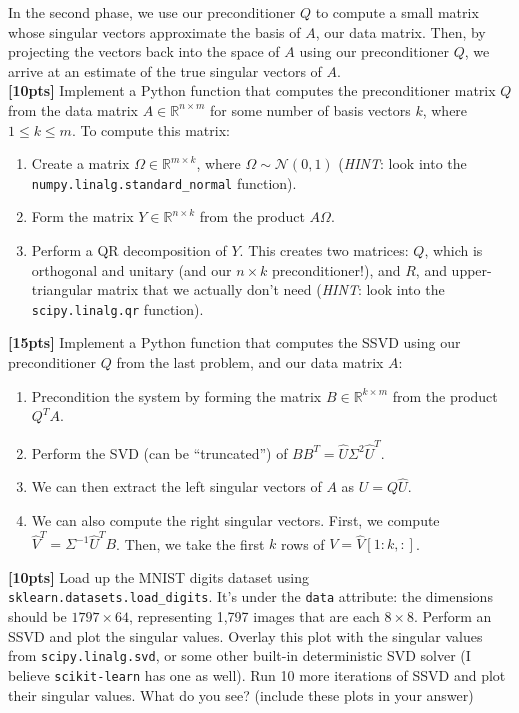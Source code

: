 \documentclass[paper=a4, fontsize=11pt]{scrartcl} %
\numberwithin{figure}{section} %
\numberwithin{table}{section} %
\begin{document}
In the second phase, we use our preconditioner $Q$ to compute a small matrix whose singular vectors approximate the basis of $A$, our data matrix. Then, by projecting the vectors back into the space of $A$ using our preconditioner $Q$, we arrive at an estimate of the true singular vectors of $A$. \\

\textbf{[10pts]} Implement a Python function that computes the preconditioner matrix $Q$ from the data matrix $A \in \mathbb{R}^{n \times m}$ for some number of basis vectors $k$, where $1 \le k \le m$. To compute this matrix:

\begin{enumerate}
	\item Create a matrix $\Omega \in \mathbb{R}^{m \times k}$, where $\Omega \sim \mathcal{N}(0, 1)$ (\emph{HINT}: look into the \\ \texttt{numpy.linalg.standard\_normal} function).
	\item Form the matrix $Y \in \mathbb{R}^{n \times k}$ from the product $A\Omega$.
	\item Perform a QR decomposition of $Y$. This creates two matrices: $Q$, which is orthogonal and unitary (and our $n \times k$ preconditioner!), and $R$, and upper-triangular matrix that we actually don't need (\emph{HINT}: look into the \texttt{scipy.linalg.qr} function).
\end{enumerate}

\textbf{[15pts]} Implement a Python function that computes the SSVD using our preconditioner $Q$ from the last problem, and our data matrix $A$:

\begin{enumerate}
	\item Precondition the system by forming the matrix $B \in \mathbb{R}^{k \times m}$ from the product $Q^TA$.
	\item Perform the SVD (can be ``truncated'') of $BB^T = \hat{U} \Sigma^2 \hat{U}^T$.
	\item We can then extract the left singular vectors of $A$ as $U = Q\hat{U}$.
	\item We can also compute the right singular vectors. First, we compute $\hat{V}^T = \Sigma^{-1} \hat{U}^T B$. Then, we take the first $k$ rows of $V = \hat{V}\left[1:k, :\right]$.
\end{enumerate}

\textbf{[10pts]} Load up the MNIST digits dataset using \texttt{sklearn.datasets.load\_digits}. It's under the \texttt{data} attribute: the dimensions should be $1797 \times 64$, representing 1,797 images that are each $8 \times 8$. Perform an SSVD and plot the singular values. Overlay this plot with the singular values from \texttt{scipy.linalg.svd}, or some other built-in deterministic SVD solver (I believe \texttt{scikit-learn} has one as well). Run 10 more iterations of SSVD and plot their singular values. What do you see? (include these plots in your answer) \\
\end{document}
